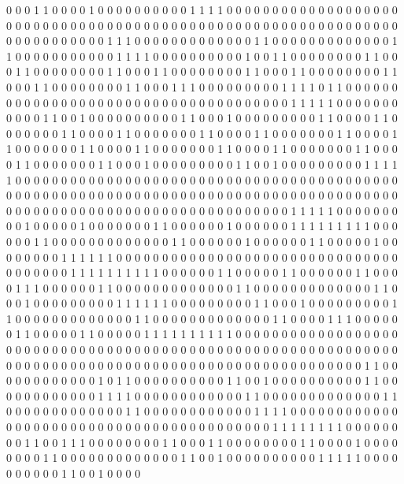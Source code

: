0 0 0 1 1 0 0 0 0 1 0 0 0 0 0
0 0 0 0 0 1 1 1 1 0 0 0 0 0 0
0 0 0 0 0 0 0 0 0 0 0 0 0 0 0
0 0 0 0 0 0 0 0 0 0 0 0 0 0 0
0 0 0 0 0 0 0 0 0 0 0 0 0 0 0
0 0 0 0 0 0 0 0 0 0 0 0 0 0 0
0 0 0 0 0 0 0 1 1 1 0 0 0 0 0
0 0 0 0 0 0 0 0 1 1 0 0 0 0 0
0 0 0 0 0 0 0 0 1 1 0 0 0 0 0
0 0 0 0 0 0 1 1 1 1 0 0 0 0 0
0 0 0 0 0 1 0 0 1 1 0 0 0 0 0
0 0 0 1 1 0 0 0 1 1 0 0 0 0 0
0 0 0 1 1 0 0 0 1 1 0 0 0 0 0
0 0 0 1 1 0 0 0 1 1 0 0 0 0 0
0 0 0 1 1 0 0 0 1 1 0 0 0 0 0
0 0 0 1 1 0 0 0 1 1 1 0 0 0 0
0 0 0 0 0 1 1 1 1 0 1 1 0 0 0
0 0 0 0 0 0 0 0 0 0 0 0 0 0 0
0 0 0 0 0 0 0 0 0 0 0 0 0 0 0
0 0 0 0 1 1 1 1 1 0 0 0 0 0 0
0 0 0 0 0 1 1 0 0 1 0 0 0 0 0
0 0 0 0 0 1 1 0 0 0 1 0 0 0 0
0 0 0 0 0 1 1 0 0 0 0 1 1 0 0
0 0 0 0 0 1 1 0 0 0 0 1 1 0 0
0 0 0 0 0 1 1 0 0 0 0 1 1 0 0
0 0 0 0 0 1 1 0 0 0 0 1 1 0 0
0 0 0 0 0 1 1 0 0 0 0 1 1 0 0
0 0 0 0 0 1 1 0 0 0 0 1 1 0 0
0 0 0 0 0 1 1 0 0 0 0 1 1 0 0
0 0 0 0 0 1 1 0 0 0 1 0 0 0 0
0 0 0 0 0 1 1 0 0 1 0 0 0 0 0
0 0 0 0 1 1 1 1 1 0 0 0 0 0 0
0 0 0 0 0 0 0 0 0 0 0 0 0 0 0
0 0 0 0 0 0 0 0 0 0 0 0 0 0 0
0 0 0 0 0 0 0 0 0 0 0 0 0 0 0
0 0 0 0 0 0 0 0 0 0 0 0 0 0 0
0 0 0 0 0 0 0 0 0 0 0 0 0 0 0
0 0 0 0 0 0 0 0 0 0 0 0 0 0 0
0 0 0 0 0 0 0 0 0 0 0 0 0 0 0
0 0 0 0 0 1 1 1 1 1 0 0 0 0 0
0 0 0 0 1 0 0 0 0 0 1 0 0 0 0
0 0 0 1 1 0 0 0 0 0 0 1 0 0 0
0 0 0 1 1 1 1 1 1 1 1 1 0 0 0
0 0 0 1 1 0 0 0 0 0 0 0 0 0 0
0 0 0 1 1 0 0 0 0 0 0 1 0 0 0
0 0 0 1 1 0 0 0 0 0 1 0 0 0 0
0 0 0 0 1 1 1 1 1 1 0 0 0 0 0
0 0 0 0 0 0 0 0 0 0 0 0 0 0 0
0 0 0 0 0 0 0 0 0 0 0 0 0 0 0
0 0 0 1 1 1 1 1 1 1 1 1 1 0 0
0 0 0 0 1 1 0 0 0 0 0 1 1 0 0
0 0 0 0 1 1 0 0 0 0 1 1 1 0 0
0 0 0 0 1 1 0 0 0 0 0 0 0 0 0
0 0 0 0 1 1 0 0 0 0 0 0 0 0 0
0 0 0 0 1 1 0 0 0 1 0 0 0 0 0
0 0 0 0 1 1 1 1 1 1 0 0 0 0 0
0 0 0 0 1 1 0 0 0 1 0 0 0 0 0
0 0 0 0 1 1 0 0 0 0 0 0 0 0 0
0 0 0 0 1 1 0 0 0 0 0 0 0 0 0
0 0 0 0 1 1 0 0 0 0 1 1 1 0 0
0 0 0 0 1 1 0 0 0 0 0 1 1 0 0
0 0 0 1 1 1 1 1 1 1 1 1 1 0 0
0 0 0 0 0 0 0 0 0 0 0 0 0 0 0
0 0 0 0 0 0 0 0 0 0 0 0 0 0 0
0 0 0 0 0 0 0 0 0 0 0 0 0 0 0
0 0 0 0 0 0 0 0 0 0 0 0 0 0 0
0 0 0 0 0 0 0 0 0 0 0 0 0 0 0
0 0 0 0 0 0 0 0 0 0 0 0 0 0 0
0 0 0 0 0 0 0 0 1 1 0 0 0 0 0
0 0 0 0 0 0 0 1 0 1 1 0 0 0 0
0 0 0 0 0 0 1 1 0 0 1 0 0 0 0
0 0 0 0 0 0 1 1 0 0 0 0 0 0 0
0 0 0 0 0 1 1 1 1 0 0 0 0 0 0
0 0 0 0 0 0 1 1 0 0 0 0 0 0 0
0 0 0 0 0 0 1 1 0 0 0 0 0 0 0
0 0 0 0 0 0 1 1 0 0 0 0 0 0 0
0 0 0 0 0 1 1 1 1 0 0 0 0 0 0
0 0 0 0 0 0 0 0 0 0 0 0 0 0 0
0 0 0 0 0 0 0 0 0 0 0 0 0 0 0
0 0 0 0 0 1 1 1 1 1 1 1 1 0 0
0 0 0 0 0 0 1 1 0 0 1 1 1 0 0
0 0 0 0 0 0 1 1 0 0 0 1 1 0 0
0 0 0 0 0 0 1 1 0 0 0 0 1 0 0
0 0 0 0 0 0 1 1 0 0 0 0 0 0 0
0 0 0 0 0 0 1 1 0 0 1 0 0 0 0
0 0 0 0 0 0 1 1 1 1 1 0 0 0 0
0 0 0 0 0 0 1 1 0 0 1 0 0 0 0
